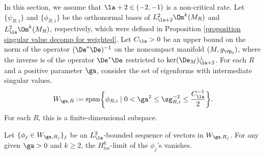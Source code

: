 \documentclass[hidelinks, 12pt, oneside, reqno]{amsart}
\begin{document}
In this section, we assume that $\la + 2 \in (-2,-1)$ is a non-critical rate. Let $\{\psi_{R,i}\}$ and $\{\phi_{R,i}\}$ be the orthonormal bases of $L^2_{\la+2}\Om^k(M_R)$ and $L^2_{\la}\Om^k(M_R)$, respectively, which were defined in Proposition \ref{proposition singular value decomp for weighted}. Let $C_{\la} > 0$ be an upper bound on the norm of the operator $(\De^*\De)^{-1}$ on the noncompact manifold $(M,g_{\vp_0})$, where the inverse is of the operator $\De^*\De$ restricted to $\ker(\De_M)^\perp_{\la+2}$. For each $R$ and a positive parameter $\ga$, consider the set of eigenforms with intermediate singular values.
\[
W_{\ga,R} := \mathrm{span}\bigg\{\phi_{R,i}\;|\; 0 < \ga^2 \le \sg_{R,i}^{-2} \le \frac{C_{\la}^{-1}}{2}\bigg\}.
\]
For each $R$, this is a finite-dimensional subspace.

\begin{lem}\label{lemma remainder vanishes on intermediate spec}
     Let $\{\phi_j \in W_{\ga, R_j} \}_j$ be an $L^2_{\la}$-bounded sequence of vectors in $W_{\ga, R_j}$. For any given $\ga > 0$ and $k \ge 2$, the $H^k_{loc}$-limit of the $\phi_j$'s vanishes.
\end{lem}
\end{document}
